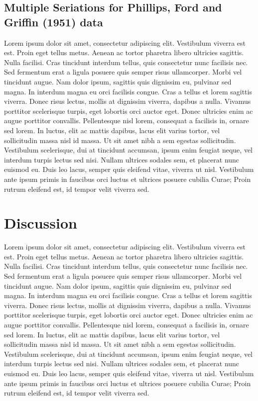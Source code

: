 \documentclass[graybox,natbib]{svmult}
\begin{document}
\subsection{Multiple Seriations for Phillips, Ford and Griffin (1951)
data}\label{multiple-seriations-for-phillips-ford-and-griffin-1951-data}

Lorem ipsum dolor sit amet, consectetur adipiscing elit. Vestibulum
viverra est est. Proin eget tellus metus. Aenean ac tortor pharetra
libero ultricies sagittis. Nulla facilisi. Cras tincidunt interdum
tellus, quis consectetur nunc facilisis nec. Sed fermentum erat a ligula
posuere quis semper risus ullamcorper. Morbi vel tincidunt augue. Nam
dolor ipsum, sagittis quis dignissim eu, pulvinar sed magna. In interdum
magna eu orci facilisis congue. Cras a tellus et lorem sagittis viverra.
Donec risus lectus, mollis at dignissim viverra, dapibus a nulla.
Vivamus porttitor scelerisque turpis, eget lobortis orci auctor eget.
Donec ultricies enim ac augue porttitor convallis. Pellentesque nisl
lorem, consequat a facilisis in, ornare sed lorem. In luctus, elit ac
mattis dapibus, lacus elit varius tortor, vel sollicitudin massa nisl id
massa. Ut sit amet nibh a sem egestas sollicitudin. Vestibulum
scelerisque, dui at tincidunt accumsan, ipsum enim feugiat neque, vel
interdum turpis lectus sed nisi. Nullam ultrices sodales sem, et
placerat nunc euismod eu. Duis leo lacus, semper quis eleifend vitae,
viverra ut nisl. Vestibulum ante ipsum primis in faucibus orci luctus et
ultrices posuere cubilia Curae; Proin rutrum eleifend est, id tempor
velit viverra sed.

\section{Discussion}\label{discussion}

Lorem ipsum dolor sit amet, consectetur adipiscing elit. Vestibulum
viverra est est. Proin eget tellus metus. Aenean ac tortor pharetra
libero ultricies sagittis. Nulla facilisi. Cras tincidunt interdum
tellus, quis consectetur nunc facilisis nec. Sed fermentum erat a ligula
posuere quis semper risus ullamcorper. Morbi vel tincidunt augue. Nam
dolor ipsum, sagittis quis dignissim eu, pulvinar sed magna. In interdum
magna eu orci facilisis congue. Cras a tellus et lorem sagittis viverra.
Donec risus lectus, mollis at dignissim viverra, dapibus a nulla.
Vivamus porttitor scelerisque turpis, eget lobortis orci auctor eget.
Donec ultricies enim ac augue porttitor convallis. Pellentesque nisl
lorem, consequat a facilisis in, ornare sed lorem. In luctus, elit ac
mattis dapibus, lacus elit varius tortor, vel sollicitudin massa nisl id
massa. Ut sit amet nibh a sem egestas sollicitudin. Vestibulum
scelerisque, dui at tincidunt accumsan, ipsum enim feugiat neque, vel
interdum turpis lectus sed nisi. Nullam ultrices sodales sem, et
placerat nunc euismod eu. Duis leo lacus, semper quis eleifend vitae,
viverra ut nisl. Vestibulum ante ipsum primis in faucibus orci luctus et
ultrices posuere cubilia Curae; Proin rutrum eleifend est, id tempor
velit viverra sed.





\end{document}
